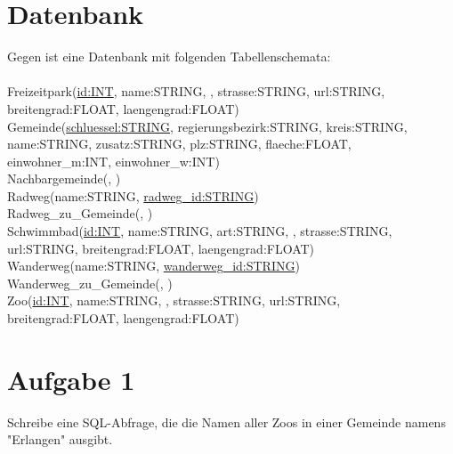 \section*{Datenbank}

Gegen ist eine Datenbank mit folgenden Tabellenschemata:  \\\\

Freizeitpark(\underline{id:INT}, name:STRING, , strasse:STRING, url:STRING, breitengrad:FLOAT, laengengrad:FLOAT)\\

Gemeinde(\underline{schluessel:STRING}, regierungsbezirk:STRING, kreis:STRING, name:STRING, zusatz:STRING, plz:STRING, flaeche:FLOAT, einwohner\_m:INT, einwohner\_w:INT)\\

Nachbargemeinde(, )\\

Radweg(name:STRING, \underline{radweg\_id:STRING})\\

Radweg\_zu\_Gemeinde(, )\\

Schwimmbad(\underline{id:INT}, name:STRING, art:STRING, , strasse:STRING, url:STRING, breitengrad:FLOAT, laengengrad:FLOAT)\\

Wanderweg(name:STRING, \underline{wanderweg\_id:STRING})\\

Wanderweg\_zu\_Gemeinde(, )\\

Zoo(\underline{id:INT}, name:STRING, , strasse:STRING, url:STRING, breitengrad:FLOAT, laengengrad:FLOAT)\\


\section*{Aufgabe 1}







\begin{minipage}[t]{\textwidth}
Schreibe eine SQL-Abfrage, die die Namen aller Zoos in einer Gemeinde namens "Erlangen" ausgibt.

\end{minipage}


